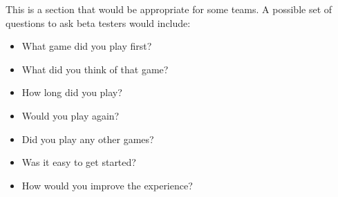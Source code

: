 \documentclass[12pt, titlepage]{article}
\begin{document}
This is a section that would be appropriate for some teams.
A possible set of questions to ask beta testers would include:
\begin{itemize}
    \item What game did you play first?
    \item What did you think of that game?
    \item How long did you play?
    \item Would you play again?
    \item Did you play any other games?
    \item Was it easy to get started?
    \item How would you improve the experience?
\end{itemize}
\end{document}
